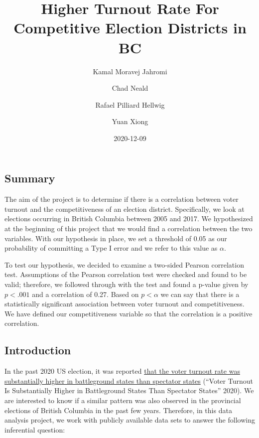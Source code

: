 \documentclass[
]{article}
\title{Higher Turnout Rate For Competitive Election Districts in BC}
\author{Kamal Moravej Jahromi \and Chad Neald \and Rafael Pilliard Hellwig \and Yuan Xiong}
\date{2020-12-09}
\begin{document}
\maketitle

{
\setcounter{tocdepth}{2}
\tableofcontents
}
\captionsetup[table]{labelformat=empty}
\captionsetup[figure]{labelformat=empty}

\hypertarget{summary}{%
\subsection{Summary}\label{summary}}

The aim of the project is to determine if there is a correlation between
voter turnout and the competitiveness of an election district.
Specifically, we look at elections occurring in British Columbia between
2005 and 2017. We hypothesized at the beginning of this project that we
would find a correlation between the two variables. With our hypothesis
in place, we set a threshold of 0.05 as our probability of committing a
Type I error and we refer to this value as \(\alpha\).

To test our hypothesis, we decided to examine a two-sided Pearson
correlation test. Assumptions of the Pearson correlation test were
checked and found to be valid; therefore, we followed through with the
test and found a p-value given by \(p < .001\) and a correlation of
0.27. Based on \(p < \alpha\) we can say that there is a statistically
significant association between voter turnout and competitiveness. We
have defined our competitiveness variable so that the correlation is a
positive correlation.

\hypertarget{introduction}{%
\subsection{Introduction}\label{introduction}}

In the past 2020 US election, it was reported
\href{https://www.nationalpopularvote.com/voter-turnout-substantially-higher-battleground-states-spectator-states}{that
the voter turnout rate was substantially higher in battleground states
than spectator states} (``Voter Turnout Is Substantially Higher in
Battleground States Than Spectator States'' 2020). We are interested to
know if a similar pattern was also observed in the provincial elections
of British Columbia in the past few years. Therefore, in this data
analysis project, we work with publicly available data sets to answer
the following inferential question:
\end{document}
